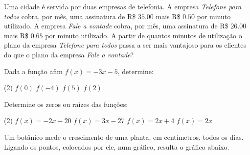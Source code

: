 \documentclass[a4paper,11pt,addpoints]{exam}
\begin{document}
\begin{questions}

    \question[1]

    Uma cidade é servida por duas empresas de telefonia. A empresa \textit{Telefone para todos}
    cobra, por mês, uma assinatura de R\$ $35.00$ mais R\$ $0.50$ por minuto utilizado. A empresa
    \textit{Fale a vontade} cobra, por mês, uma assinatura de R\$ $26.00$ mais R\$ $0.65$ por minuto
    utilizado. A partir de quantos minutos de utilização o plano da empresa \textit{Telefone para todos}
    passa a ser mais vantajoso para os clientes do que o plano da empresa \textit{Fale a vontade}?

    \question[1]

    Dada a função afim $f(x) = -3x -5$, determine:

    \begin{tasks}(2)
        \task $f(0)$
        \task $f(-4)$
        \task $f(5)$
        \task $f(2)$
    \end{tasks}

    \question[1]

    Determine os zeros ou raízes das funções:

    \begin{tasks}(2)
        \task $f(x) = -2x - 20$
        \task $f(x) = 3x - 27$
        \task $f(x) = 2x + 4$
        \task $f(x) = 2x$
    \end{tasks}

    \question[1]

    Um botânico mede o crescimento de uma planta, em centímetros, todos os dias.
    Ligando os pontos, colocados por ele, num gráfico, resulta o gráfico abaixo.

    \begin{center}
    \end{center}


\end{questions}
\end{document}
